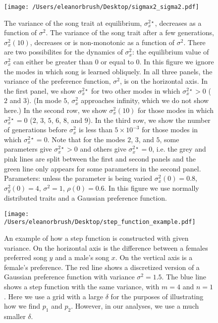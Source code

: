 \documentclass{article}
\begin{document}
\begin{figure}
\texttt{[image: /Users/eleanorbrush/Desktop/sigmax2\_sigma2.pdf]}
\caption{\label{sigmax2_sigma2} The variance of the song trait at equilibrium, $\sigma_x^{2\star}$, decreases as a function of $\sigma^2$. The variance of the song trait after a few generations, $\sigma_x^2(10)$, decreases or is non-monotonic as a function of $\sigma^2$. There are two possibilites for the dynamics of $\sigma_x^2$: the equilibrium value of $\sigma_x^2$ can either be greater than $0$ or equal to $0$. In this figure we ignore the modes in which song is learned obliquely. In all three panels, the variance of the preference function, $\sigma^2$, is on the horizontal axis. In the first panel, we show $\sigma_x^{2\star}$ for two other modes in which $\sigma_x^{2\star}>0$ ($2$ and $3$). (In mode $5$, $\sigma_x^2$ approaches infinity, which we do not show here.) In the second row, we show $\sigma_x^2(10)$  for those modes in which $\sigma_x^{2\star}=0$ ($2$, $3$, $5$, $6$, $8$, and $9$). In the third row, we show the number of generations before $\sigma_x^2$ is less than $5\times10^{-3}$ for those modes in which $\sigma_x^{2\star}=0$. Note that for the modes $2$, $3$, and $5$, some parameters give $\sigma_x^{2\star}>0$ and others give $\sigma_x^{2\star}=0$, i.e. the grey and pink lines are split between the first and second panels and the green line only appears for some parameters in the second panel. Parameters: unless the parameter is being varied $\sigma_x^2(0)=0.8$, $\sigma_y^2(0)=4$, $\sigma^2=1$, $\rho(0)=0.6$. In this figure we use normally distributed traits and a Gaussian preference function. }
\end{figure}

\begin{figure}
\texttt{[image: /Users/eleanorbrush/Desktop/step\_function\_example.pdf]}
\caption{\label{step_ex}An example of how a step function is constructed with given variance. On the horizontal axis is the difference between a females preferred song $y$ and a male's song $x$. On the vertical axis is a female's preference. The red line shows a discretized version of a Gaussian preference function with variance $\sigma^2=1.5$. The blue line shows a step function with the same variance, with $m=4$ and $n=1$. Here we use a grid with a large $\delta$ for the purposes of illustrating how we find $p_1$ and $p_2$. However, in our analyses, we use a much smaller $\delta$. }
\end{figure}
\end{document}
